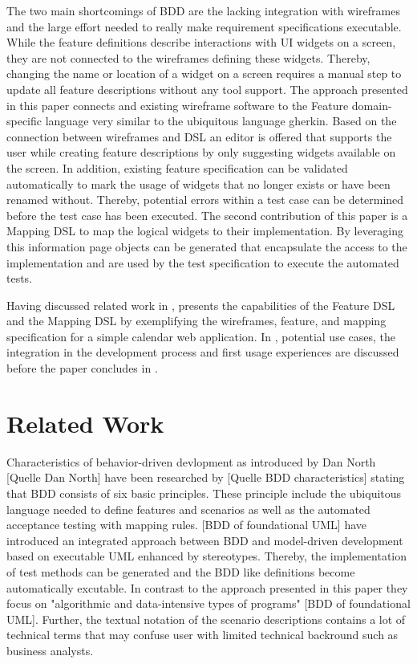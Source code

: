 \documentclass{sig-alternate-05-2015}
\begin{document}
The two main shortcomings of BDD are the lacking integration with wireframes and the large effort needed to really make requirement specifications executable.
While the feature definitions describe interactions with UI widgets on a screen, they are not connected to the wireframes defining these widgets.
Thereby, changing the name or location of a widget on a screen requires a manual step to update all feature descriptions without any tool support.
The approach presented in this paper connects and existing wireframe software to the Feature domain-specific language very similar to the ubiquitous language gherkin. 
Based on the connection between wireframes and DSL an editor is offered that supports the user while creating feature descriptions by only suggesting widgets available on the screen.
In addition, existing feature specification can be validated automatically to mark the usage of widgets that no longer exists or have been renamed without.
Thereby, potential errors within a test case can be determined before the test case has been executed.
The second contribution of this paper is a Mapping DSL to map the logical widgets to their implementation.
By leveraging this information page objects can be generated that encapsulate the access to the implementation and are used by the test specification to execute the automated tests.

Having discussed related work in ,  presents the capabilities of the Feature DSL and the Mapping DSL by exemplifying the wireframes, feature, and mapping specification for a simple calendar web application.
In , potential use cases, the integration in the development process and first usage experiences are discussed before the paper concludes in .


\section{Related Work}\label{sec:RelatedWork}
Characteristics of behavior-driven devlopment as introduced by Dan North [Quelle Dan North] have been researched by [Quelle BDD characteristics] stating that BDD consists of six basic principles.
These principle include the ubiquitous language needed to define features and scenarios as well as the automated acceptance testing with mapping rules.
[BDD of foundational UML] have introduced an integrated approach between BDD and model-driven development based on executable UML enhanced by stereotypes.
Thereby, the implementation of test methods can be generated and the BDD like definitions become automatically excutable.
In contrast to the approach presented in this paper they focus on "algorithmic and data-intensive types of programs" [BDD of foundational UML].
Further, the textual notation of the scenario descriptions contains a lot of technical terms that may confuse user with limited technical backround such as business analysts.
\end{document}
